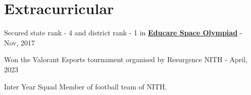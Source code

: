 \documentclass[a4paper,20pt]{article}
\begin{document}
\vspace{0pt}
\section{Extracurricular}
\begin{description}[font=$\bullet$]
\item {Secured state rank - 4 and district rank - 1 in {\color{blue}\href{https://www.linkedin.com/posts/prathmesh-chhabra-51760719b_educare-activity-6758391883443138560-phJb/}{\textbf{Educare Space Olympiad}}} - Nov, 2017}
\vspace{-5pt}
\item {Won the Valorant Esports tournament organised by Resurgence NITH - April, 2023 }
\vspace{-5pt}
\item {Inter Year Squad Member of football team of NITH.}

\end{description}
\end{document}
